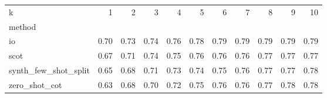\begin{tabular}{lrrrrrrrrrr}
\toprule
k & 1 & 2 & 3 & 4 & 5 & 6 & 7 & 8 & 9 & 10 \\
method &  &  &  &  &  &  &  &  &  &  \\
\midrule
io & 0.70 & 0.73 & 0.74 & 0.76 & 0.78 & 0.79 & 0.79 & 0.79 & 0.79 & 0.79 \\
scot & 0.67 & 0.71 & 0.74 & 0.75 & 0.76 & 0.76 & 0.76 & 0.77 & 0.77 & 0.77 \\
synth_few_shot_split & 0.65 & 0.68 & 0.71 & 0.73 & 0.74 & 0.75 & 0.76 & 0.77 & 0.77 & 0.78 \\
zero_shot_cot & 0.63 & 0.68 & 0.70 & 0.72 & 0.75 & 0.76 & 0.76 & 0.77 & 0.78 & 0.78 \\
\bottomrule
\end{tabular}
